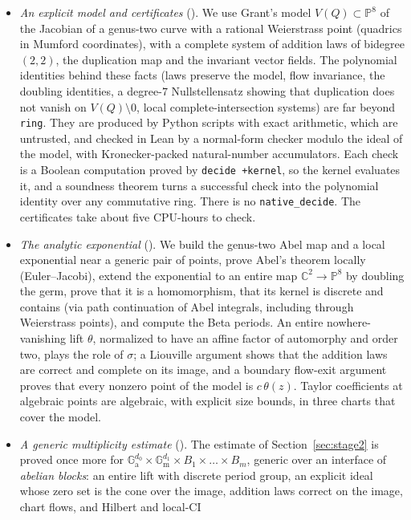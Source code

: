 \documentclass[11pt]{amsart}
\theoremstyle{definition}
\theoremstyle{remark}
\numberwithin{equation}{section}
\newcommand{\CC}{\mathbb{C}}
\newcommand{\PP}{\mathbb{P}}
\newcommand{\Ga}{\mathbb{G}_{\mathrm{a}}}
\newcommand{\Gm}{\mathbb{G}_{\mathrm{m}}}
\begin{document}
\begin{itemize}
\item \emph{An explicit model and certificates} (). We use Grant's model $V(Q)\subset\PP^8$ of the
Jacobian of a genus-two curve with a rational Weierstrass point (quadrics in Mumford coordinates), with a
complete system of addition laws of bidegree $(2,2)$, the duplication map and the invariant vector fields.
The polynomial identities behind these facts (laws preserve the model, flow invariance, the doubling
identities, a degree-$7$ Nullstellensatz showing that duplication does not vanish on $V(Q)\setminus0$, local
complete-intersection systems) are far beyond \texttt{ring}. They are produced by Python scripts with exact
arithmetic, which are untrusted, and checked in Lean by a normal-form checker modulo the ideal of the
model, with Kronecker-packed natural-number accumulators. Each check is a Boolean computation proved by
\texttt{decide\ +kernel}, so the kernel evaluates it, and a soundness theorem turns a successful check into the
polynomial identity over any commutative ring. There is no \texttt{native\_decide}. The certificates take
about five CPU-hours to check.
\item \emph{The analytic exponential} (). We build the genus-two Abel map and a local
exponential near a generic pair of points, prove Abel's theorem locally (Euler--Jacobi), extend the
exponential to an entire map $\CC^2\to\PP^8$ by doubling the germ, prove that it is a homomorphism, that
its kernel is discrete and contains  (via path continuation of Abel integrals, including through
Weierstrass points), and compute the Beta periods. An entire nowhere-vanishing lift $\theta$, normalized
to have an affine factor of automorphy and order two, plays the role of $\sigma$; a Liouville argument shows
that the addition laws are correct and complete on its image, and a boundary flow-exit argument proves that
every nonzero point of the model is $c\,\theta(z)$. Taylor coefficients at algebraic points are algebraic,
with explicit size bounds, in three charts that cover the model.
\item \emph{A generic multiplicity estimate} (). The estimate of Section~\ref{sec:stage2} is
proved once more for $\Ga^{d_0}\times\Gm^{d_1}\times B_1\times\dots\times B_m$, generic over an interface of
\emph{abelian blocks}: an entire lift with discrete period group, an explicit ideal whose zero set is the
cone over the image, addition laws correct on the image, chart flows, and Hilbert and local-CI

\end{itemize}
\end{document}
